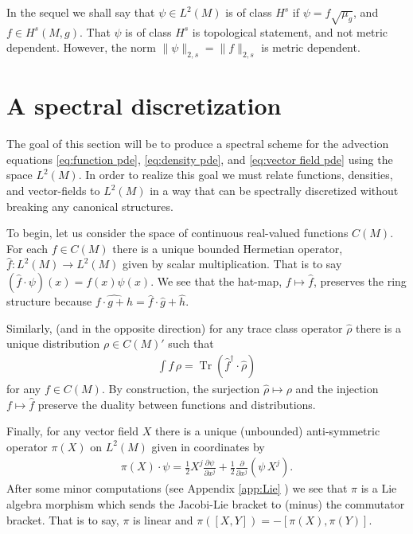 \documentclass[12pt]{amsart}
\newcommand{\pder}[2]{\ensuremath{\frac{ \partial #1}{\partial #2}}}
\DeclareMathOperator{\Tr}{Tr}
\begin{document}
In the sequel we shall say that $\psi \in L^2(M)$ is of class $H^s$ if $\psi = f \sqrt{\mu_g}$, and $f \in H^s(M,g)$.
That $\psi$ is of class $H^{s}$ is topological statement, and not metric dependent.
However, the norm $\| \psi \|_{2,s} = \| f \|_{2,s}$ is metric dependent.

\section{A spectral discretization}
The goal of this section will be to produce a spectral scheme for the advection equations \eqref{eq:function pde}, \eqref{eq:density pde}, and \eqref{eq:vector field pde}
using the space $L^{2}(M)$.
In order to realize this goal we must relate functions, densities, and vector-fields to $L^{2}(M)$ in a way that can be spectrally discretized without breaking any canonical structures.

To begin, let us consider the space of continuous real-valued functions $C(M)$.
For each $f \in C(M)$ there is a unique bounded Hermetian operator, $\hat{f} : L^{2}(M) \to L^{2}(M)$ given by scalar multiplication.
That is to say $(\hat{f} \cdot \psi) (x) = f(x) \psi(x)$.
We see that the hat-map, $f \mapsto \hat{f}$, preserves the ring structure because $\widehat{f \cdot g + h} = \hat{f} \cdot \hat{g} + \hat{h}$.

Similarly, (and in the opposite direction) for any trace class operator $\hat{\rho}$ there is a unique distribution $\rho \in C(M)'$ such that 
\begin{align}
	 \int f \, \rho = \Tr ( \hat{f}^{\dagger} \cdot \hat{\rho} )
\end{align}
for any $f \in C(M)$.
By construction, the surjection $\hat{\rho} \mapsto \rho$ and the injection $f \mapsto \hat{f}$ preserve the duality between functions and distributions.

Finally, for any vector field $X$ there is a unique (unbounded) anti-symmetric operator $\pi(X)$ on $L^{2}(M)$
given in coordinates by
\begin{align}
	\pi(X) \cdot \psi = \frac{1}{2} X^{j} \pder{\psi}{x^{j}} + \frac{1}{2} \pder{}{x^{j}} ( \psi \, X^{j} ). \label{eq:representation}
\end{align}
After some minor computations (see Appendix \ref{app:Lie}  ) we see that $\pi$ is a Lie algebra morphism which sends
the Jacobi-Lie bracket to (minus) the commutator bracket.  That is to say, $\pi$ is linear and $\pi([X,Y]) = - [ \pi(X) , \pi(Y)]$.
\end{document}
